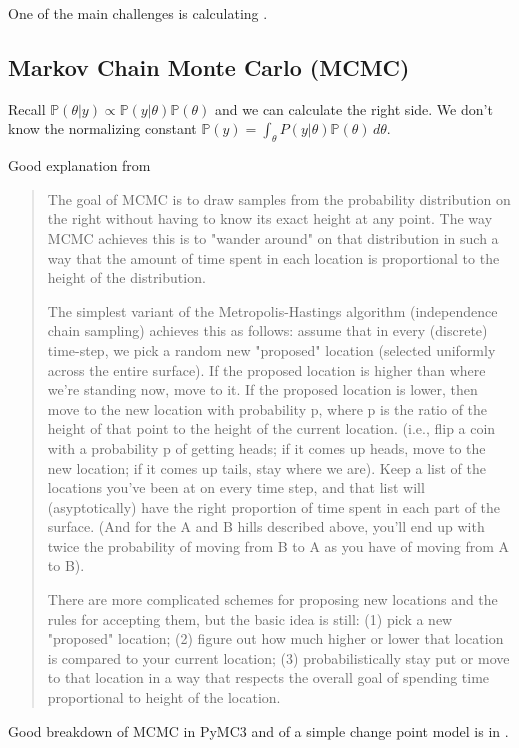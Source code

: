 \documentclass[12pt]{article}
\newcommand{\PP}{\ensuremath{\mathbb{P}}}
\begin{document}
One of the main challenges is calculating .

\subsection{Markov Chain Monte Carlo (MCMC)}


Recall $\PP(\theta|y) \propto \PP(y|\theta) \PP(\theta)$ and we can calculate the
right side. We don't know the normalizing constant $\PP(y) = \int_\theta P(y|\theta)
\PP(\theta) \, d\theta$.

Good explanation from \cite{12657}
\begin{quote}
  The goal of MCMC is to draw samples from the probability distribution on the
right without having to know its exact height at any point. The way MCMC achieves this is to
"wander around" on that distribution in such a way that the amount of time spent
in each location is proportional to the height of the distribution.

The simplest variant of the Metropolis-Hastings algorithm (independence chain sampling) achieves this as follows: assume that in every (discrete) time-step, we pick a random new "proposed" location (selected uniformly across the entire surface). If the proposed location is higher than where we're standing now, move to it. If the proposed location is lower, then move to the new location with probability p, where p is the ratio of the height of that point to the height of the current location. (i.e., flip a coin with a probability p of getting heads; if it comes up heads, move to the new location; if it comes up tails, stay where we are). Keep a list of the locations you've been at on every time step, and that list will (asyptotically) have the right proportion of time spent in each part of the surface. (And for the A and B hills described above, you'll end up with twice the probability of moving from B to A as you have of moving from A to B).

There are more complicated schemes for proposing new locations and the rules for
accepting them, but the basic idea is still: (1) pick a new "proposed" location;
(2) figure out how much higher or lower that location is compared to your
current location; (3) probabilistically stay put or move to that location in a
way that respects the overall goal of spending time proportional to height of
the location.
\end{quote}

Good breakdown of MCMC in PyMC3  and of a simple change point model is in \cite[Ch. 1]{pilon16_bayes}.
\end{document}
